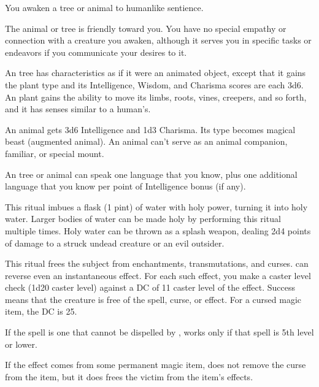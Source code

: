 \spelleffect You awaken a tree or animal to humanlike sentience.
\par The  animal or tree is friendly toward you. You have no special empathy or connection with a creature you awaken, although it serves you in specific tasks or endeavors if you communicate your desires to it.
\par An  tree has characteristics as if it were an animated object, except that it gains the plant type and its Intelligence, Wisdom, and Charisma scores are each 3d6. An  plant gains the ability to move its limbs, roots, vines, creepers, and so forth, and it has senses similar to a human's.
\par An  animal gets 3d6 Intelligence and \plus1d3 Charisma. Its type becomes magical beast (augmented animal). An  animal can't serve as an animal companion, familiar, or special mount.
\par An  tree or animal can speak one language that you know, plus one additional language that you know per point of Intelligence bonus (if any).

\spelleffect This ritual imbues a flask (1 pint) of water with holy power, turning it into holy water. Larger bodies of water can be made holy by performing this ritual multiple times.
\spellnotes Holy water can be thrown as a splash weapon, dealing 2d4 points of damage to a struck undead creature or an evil outsider.

\spelleffect This ritual frees the subject from enchantments, transmutations, and curses.  can reverse even an instantaneous effect. For each such effect, you make a caster level check (1d20 \add caster level) against a DC of 11 \add caster level of the effect. Success means that the creature is free of the spell, curse, or effect. For a cursed magic item, the DC is 25.
\par If the spell is one that cannot be dispelled by ,  works only if that spell is 5th level or lower.
\par If the effect comes from some permanent magic item,  does not remove the curse from the item, but it does frees the victim from the item's effects.

